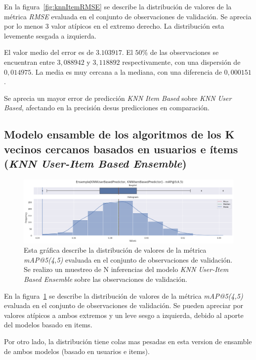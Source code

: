\documentclass[11pt,a4paper,twoside]{thesis}
\begin{document}
En la figura~\ref{fig:knnItemRMSE} se describe la distribución de valores de la
métrica \textit{RMSE} evaluada en el conjunto de observaciones de validación.
Se aprecia por lo menos $3$ valor atípicos en el extremo derecho. La
distribución esta levemente sesgada a izquierda.

El valor medio del error es de $3.103917$. El $50$\% de las observaciones se
encuentran entre $3,088942$ y $3,118892$ respectivamente, con una dispersión de
$0,014975$. La media es muy cercana a la mediana, con una diferencia de
$0,000151$.

Se aprecia un mayor error de predicción \textit{KNN Item Based} sobre
\textit{KNN User Based}, afectando en la precisión desus predicciones en
comparación.

\subsection{Modelo ensamble de los algoritmos de los K
	vecinos cercanos basados en usuarios e ítems
	(\textit{KNN User-Item Based Ensemble})
}

\begin{figure}[!htb]
	\centering
	\includegraphics[width=15cm]{./images/metrics-knn-ensemple-mapk.png}
	\caption{
		Esta gráfica describe la distribución de valores de la métrica
		\textit{mAP@5(4,5)} evaluada en el conjunto de observaciones de
		validación. Se realizo un muestreo de N inferencias del modelo
		\textit{KNN User-Item Based Ensemble} sobre las observaciones
		de validación.
	}
	\label{fig:knnEnsempleMAP}
\end{figure}

En la figura~\ref{fig:knnEnsempleMAP} se describe la distribución de valores de
la métrica \textit{mAP@5(4,5)} evaluada en el conjunto de observaciones de
validación. Se pueden apreciar por valores atípicos a ambos extremos y un leve
sesgo a izquierda, debido al aporte del modelos basado en items.

Por otro lado, la distribución tiene colas mas pesadas en esta version de
ensamble de ambos modelos (basado en usuarios e items).
\end{document}
